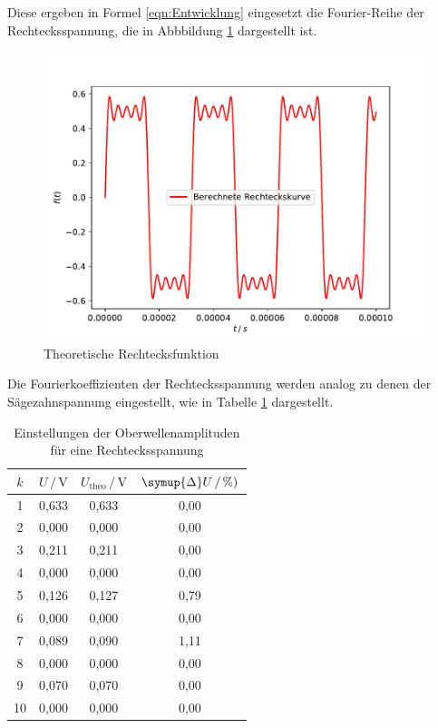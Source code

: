 Diese ergeben in Formel \eqref{eqn:Entwicklung} eingesetzt die Fourier-Reihe
der Rechtecksspannung, die in Abbbildung \ref{fig:Theo2}  dargestellt ist.

\begin{figure}[H]
    \centering
    \includegraphics[scale = 0.6]{content/plot5.pdf}
    \caption{Theoretische Rechtecksfunktion}
    \label{fig:Theo2}
\end{figure}

Die Fourierkoeffizienten der Rechtecksspannung werden analog zu denen der Sägezahnspannung
eingestellt, wie in Tabelle \ref{tab:Messdaten5} dargestellt. 

\begin{table}[H]
    \centering
    \caption{Einstellungen der Oberwellenamplituden für eine Rechtecksspannung}
    \label{tab:Messdaten5}
    \begin{tabular}{c c c c}
    \toprule
    $k$ & $U \,/\, \si{\volt}$ & $U_\text{theo} \,/\, \si{\volt}$ & $\symup{\Delta}U \,/\, \si{\percent})$ \\
    \midrule
     1 & 0,633 & 0,633 & 0,00 \\
     2 & 0,000 & 0,000 & 0,00 \\
     3 & 0,211 & 0,211 & 0,00 \\
     4 & 0,000 & 0,000 & 0,00 \\
     5 & 0,126 & 0,127 & 0,79 \\
     6 & 0,000 & 0,000 & 0,00 \\
     7 & 0,089 & 0,090 & 1,11 \\
     8 & 0,000 & 0,000 & 0,00 \\
     9 & 0,070 & 0,070 & 0,00 \\
    10 & 0,000 & 0,000 & 0,00 \\
    \bottomrule
    \end{tabular}
\end{table}

